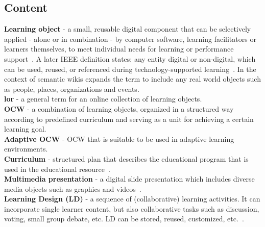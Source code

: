 \documentclass[PhD, Submit, ngerman,UKenglish,table]{scrbook}
\begin{document}
\subsection{Content}
\textbf{Learning object} - a small, reusable digital component that can be selectively applied - alone or in combination - by computer software, learning facilitators or learners themselves, to meet individual needs for learning or performance support~\cite{shepherd2000objects}.
A later IEEE definition states: any entity digital or non-digital, which can be used, reused, or referenced during technology-supported learning~\cite{learn_definition2002}.
In the context of semantic wikis \cite{Li2010a} expands the term to include any real world objects such as people, places, organizations and events.\\
\textbf{\gls{lor}} - a general term for an online collection of learning objects.\\
\textbf{OCW} - a combination of learning objects, organized in a structured way according to predefined curriculum and serving as a unit for achieving a certain learning goal.\\
\textbf{Adaptive OCW} - OCW that is suitable to be used in adaptive learning environments.\\
\textbf{Curriculum} - structured plan that describes the educational program that is used in the educational resource~\cite{Marcilla2012}.\\
\textbf{Multimedia presentation} - a digital slide presentation which includes diverse media objects such as graphics and videos~\cite{Hong2012}.\\
\textbf{Learning Design (LD)} - a sequence of (collaborative) learning activities. It can incorporate single learner content, but also collaborative tasks such as discussion, voting, small group debate, etc. LD can be stored, reused, customized, etc.~\cite{Romero-Moreno2007}.\\
\end{document}
